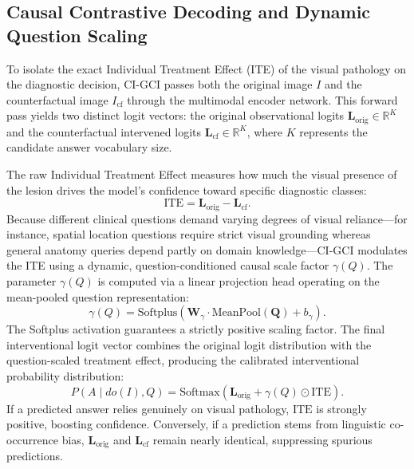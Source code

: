 \documentclass[journal,twoside,web]{ieeecolor}
\begin{document}
\subsection{Causal Contrastive Decoding and Dynamic Question Scaling}
To isolate the exact Individual Treatment Effect (ITE) of the visual pathology on the diagnostic decision, CI-GCI passes both the original image $I$ and the counterfactual image $I_{\text{cf}}$ through the multimodal encoder network. This forward pass yields two distinct logit vectors: the original observational logits $\mathbf{L}_{\text{orig}} \in \mathbb{R}^{K}$ and the counterfactual intervened logits $\mathbf{L}_{\text{cf}} \in \mathbb{R}^{K}$, where $K$ represents the candidate answer vocabulary size.

The raw Individual Treatment Effect measures how much the visual presence of the lesion drives the model's confidence toward specific diagnostic classes:
\begin{equation}
\text{ITE} = \mathbf{L}_{\text{orig}} - \mathbf{L}_{\text{cf}}.
\label{eq:ite}
\end{equation}
Because different clinical questions demand varying degrees of visual reliance---for instance, spatial location questions require strict visual grounding whereas general anatomy queries depend partly on domain knowledge---CI-GCI modulates the ITE using a dynamic, question-conditioned causal scale factor $\gamma(Q)$. The parameter $\gamma(Q)$ is computed via a linear projection head operating on the mean-pooled question representation:
\begin{equation}
\gamma(Q) = \text{Softplus}\left(\mathbf{W}_{\gamma} \cdot \text{MeanPool}(\mathbf{Q}) + b_{\gamma}\right).
\label{eq:gamma_q}
\end{equation}
The Softplus activation guarantees a strictly positive scaling factor. The final interventional logit vector combines the original logit distribution with the question-scaled treatment effect, producing the calibrated interventional probability distribution:
\begin{equation}
P(A \mid do(I), Q) = \text{Softmax}\left(\mathbf{L}_{\text{orig}} + \gamma(Q) \odot \text{ITE}\right).
\label{eq:calibrated_prob}
\end{equation}
If a predicted answer relies genuinely on visual pathology, $\text{ITE}$ is strongly positive, boosting confidence. Conversely, if a prediction stems from linguistic co-occurrence bias, $\mathbf{L}_{\text{orig}}$ and $\mathbf{L}_{\text{cf}}$ remain nearly identical, suppressing spurious predictions.
\end{document}
